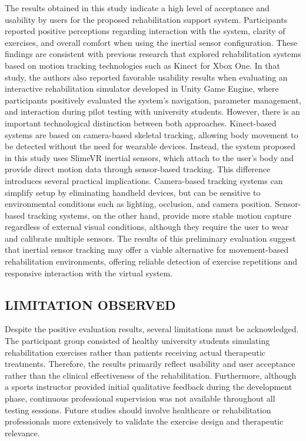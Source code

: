 \documentclass[a4paper,twoside]{article}
\begin{document}
The results obtained in this study indicate a high level of acceptance and usability by users for the proposed rehabilitation support system. Participants reported positive perceptions regarding interaction with the system, clarity of exercises, and overall comfort when using the inertial sensor configuration.
These findings are consistent with previous research that explored rehabilitation systems based on motion
tracking technologies such as Kinect for Xbox One\cite{Qu, 2025}. In that study, the authors also reported favorable usability results when evaluating an interactive rehabilitation simulator developed in Unity Game Engine, where participants positively evaluated the system's navigation, parameter management, and interaction during pilot testing with university students.
However, there is an important technological distinction between both approaches. Kinect-based systems are based on camera-based skeletal tracking, allowing body movement to be detected without the need for wearable devices. Instead, the system proposed in this study uses SlimeVR inertial sensors, which attach to the user's body and provide direct motion data through sensor-based tracking.
This difference introduces several practical implications. Camera-based tracking systems can simplify setup by eliminating handheld devices, but can be sensitive to environmental conditions such as lighting, occlusion, and camera position. Sensor-based tracking systems, on the other hand, provide more stable motion capture regardless of external visual conditions, although they require the user to wear and calibrate multiple sensors.
The results of this preliminary evaluation suggest that inertial sensor tracking may offer a viable alternative for movement-based rehabilitation environments, offering reliable detection of exercise repetitions and responsive interaction with the virtual system.

\subsection{\uppercase{Limitation Observed}}

Despite the positive evaluation results, several limitations must be acknowledged. The participant group consisted of healthy university students simulating rehabilitation exercises rather than patients receiving actual therapeutic treatments. Therefore, the results primarily reflect usability and user acceptance rather than the clinical effectiveness of the rehabilitation.
Furthermore, although a sports instructor provided initial qualitative feedback during the development phase, continuous professional supervision was not available throughout all testing sessions. Future studies should involve healthcare or rehabilitation professionals more extensively to validate the exercise design and therapeutic relevance.
\end{document}
